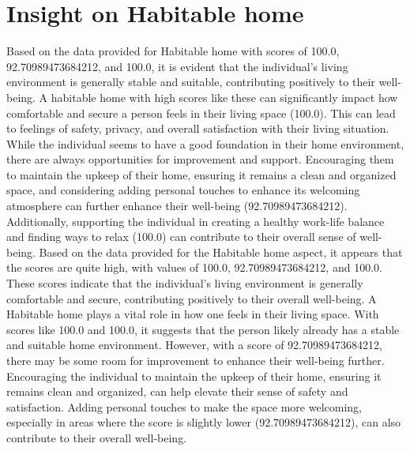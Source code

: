 \documentclass[10pt, a4paper]{article}%
\begin{document}
\section{Insight on Habitable home}%
\label{sec:InsightonHabitablehome}%
Based on the data provided for Habitable home with scores of 100.0, 92.70989473684212, and 100.0, it is evident that the individual's living environment is generally stable and suitable, contributing positively to their well{-}being. A habitable home with high scores like these can significantly impact how comfortable and secure a person feels in their living space (100.0). This can lead to feelings of safety, privacy, and overall satisfaction with their living situation.\newline%
\newline%
While the individual seems to have a good foundation in their home environment, there are always opportunities for improvement and support. Encouraging them to maintain the upkeep of their home, ensuring it remains a clean and organized space, and considering adding personal touches to enhance its welcoming atmosphere can further enhance their well{-}being (92.70989473684212). Additionally, supporting the individual in creating a healthy work{-}life balance and finding ways to relax (100.0) can contribute to their overall sense of well{-}being.\newline%
\newline%
Based on the data provided for the Habitable home aspect, it appears that the scores are quite high, with values of 100.0, 92.70989473684212, and 100.0. These scores indicate that the individual's living environment is generally comfortable and secure, contributing positively to their overall well{-}being.\newline%
\newline%
A Habitable home plays a vital role in how one feels in their living space. With scores like 100.0 and 100.0, it suggests that the person likely already has a stable and suitable home environment. However, with a score of 92.70989473684212, there may be some room for improvement to enhance their well{-}being further.\newline%
\newline%
Encouraging the individual to maintain the upkeep of their home, ensuring it remains clean and organized, can help elevate their sense of safety and satisfaction. Adding personal touches to make the space more welcoming, especially in areas where the score is slightly lower (92.70989473684212), can also contribute to their overall well{-}being.\newline%
\end{document}

